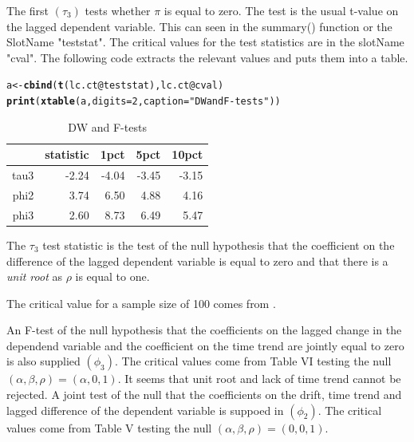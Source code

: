 \documentclass{article}\usepackage{graphicx, color}
\makeatletter
\newcommand{\hlfunctioncall}[1]{\textcolor[rgb]{0.501960784313725,0,0.329411764705882}{\textbf{#1}}}%
\newcommand{\hlstring}[1]{\textcolor[rgb]{0.6,0.6,1}{#1}}%
\newenvironment{kframe}{%
 \def\at@end@of@kframe{}%
 \ifinner\ifhmode%
  \def\at@end@of@kframe{\end{minipage}}%
  \begin{minipage}{\columnwidth}%
 \fi\fi%
 \def\FrameCommand##1{\hskip\@totalleftmargin \hskip-\fboxsep
 \colorbox{shadecolor}{##1}\hskip-\fboxsep
     \hskip-\linewidth \hskip-\@totalleftmargin \hskip\columnwidth}%
 \MakeFramed {\advance\hsize-\width
   \@totalleftmargin\z@ \linewidth\hsize
   \@setminipage}}%
 {\par\unskip\endMakeFramed%
 \at@end@of@kframe}
\makeatother
\begin{document}
The first $(\tau_3)$ tests whether $\pi$ is equal to zero.  The test is the usual t-value on the lagged dependent variable. This can seen in the summary() function or the SlotName "teststat".  The critical values for the test statistics are in the slotName "cval".  The following code extracts the relevant values and puts them into a table. 
\begin{kframe}
\begin{alltt}
a <- \hlfunctioncall{cbind}(\hlfunctioncall{t}(lc.ct@teststat), lc.ct@cval)
\hlfunctioncall{print}(\hlfunctioncall{xtable}(a, digits = 2, caption = \hlstring{"DW and F-tests"}))
\end{alltt}
\end{kframe}%
\begin{table}[ht]
\begin{center}
\begin{tabular}{rrrrr}
  \hline
 & statistic & 1pct & 5pct & 10pct \\ 
  \hline
tau3 & -2.24 & -4.04 & -3.45 & -3.15 \\ 
  phi2 & 3.74 & 6.50 & 4.88 & 4.16 \\ 
  phi3 & 2.60 & 8.73 & 6.49 & 5.47 \\ 
   \hline
\end{tabular}
\caption{DW and F-tests}
\end{center}
\end{table}



The $\tau_3$ test statistic is the test of the null hypothesis that the coefficient on the difference of the lagged dependent variable is equal to zero and that there is a \emph{unit root} as $\rho$ is equal to one.  


The critical value for a sample size of 100 comes from \citep{Fuller1976}. 

An F-test of the null hypothesis that the coefficients on the lagged change in the dependend variable and the coefficient on the time trend are jointly equal to zero is also supplied $(\phi_3)$.  The critical values come from Table VI \citep{DF1981} testing the null $(\alpha, \beta, \rho) = (\alpha, 0, 1)$.  It seems that unit root and lack of time trend cannot be rejected. A joint test of the null that the coefficients on the drift, time trend and lagged difference of the dependent variable is suppoed in $(\phi_2)$.  The critical values come from Table V \citep{DF1981} testing the null $(\alpha, \beta, \rho) = (0, 0, 1)$.
\end{document}
